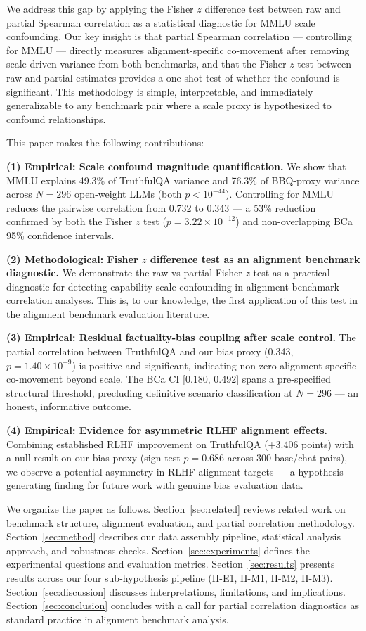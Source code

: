We address this gap by applying the Fisher $z$ difference test between raw and partial Spearman correlation as a statistical diagnostic for MMLU scale confounding. Our key insight is that partial Spearman correlation --- controlling for MMLU --- directly measures alignment-specific co-movement after removing scale-driven variance from both benchmarks, and that the Fisher $z$ test between raw and partial estimates provides a one-shot test of whether the confound is significant. This methodology is simple, interpretable, and immediately generalizable to any benchmark pair where a scale proxy is hypothesized to confound relationships.

This paper makes the following contributions:

\textbf{(1) Empirical: Scale confound magnitude quantification.} We show that MMLU explains 49.3\% of TruthfulQA variance and 76.3\% of BBQ-proxy variance across $N{=}296$ open-weight LLMs (both $p < 10^{-44}$). Controlling for MMLU reduces the pairwise correlation from 0.732 to 0.343 --- a 53\% reduction confirmed by both the Fisher $z$ test ($p = 3.22 \times 10^{-12}$) and non-overlapping BCa 95\% confidence intervals.

\textbf{(2) Methodological: Fisher $z$ difference test as an alignment benchmark diagnostic.} We demonstrate the raw-vs-partial Fisher $z$ test as a practical diagnostic for detecting capability-scale confounding in alignment benchmark correlation analyses. This is, to our knowledge, the first application of this test in the alignment benchmark evaluation literature.

\textbf{(3) Empirical: Residual factuality-bias coupling after scale control.} The partial correlation between TruthfulQA and our bias proxy (0.343, $p = 1.40 \times 10^{-9}$) is positive and significant, indicating non-zero alignment-specific co-movement beyond scale. The BCa CI [0.180, 0.492] spans a pre-specified structural threshold, precluding definitive scenario classification at $N{=}296$ --- an honest, informative outcome.

\textbf{(4) Empirical: Evidence for asymmetric RLHF alignment effects.} Combining established RLHF improvement on TruthfulQA (+3.406 points) with a null result on our bias proxy (sign test $p = 0.686$ across 300 base/chat pairs), we observe a potential asymmetry in RLHF alignment targets --- a hypothesis-generating finding for future work with genuine bias evaluation data.

We organize the paper as follows. Section~\ref{sec:related} reviews related work on benchmark structure, alignment evaluation, and partial correlation methodology. Section~\ref{sec:method} describes our data assembly pipeline, statistical analysis approach, and robustness checks. Section~\ref{sec:experiments} defines the experimental questions and evaluation metrics. Section~\ref{sec:results} presents results across our four sub-hypothesis pipeline (H-E1, H-M1, H-M2, H-M3). Section~\ref{sec:discussion} discusses interpretations, limitations, and implications. Section~\ref{sec:conclusion} concludes with a call for partial correlation diagnostics as standard practice in alignment benchmark analysis.
